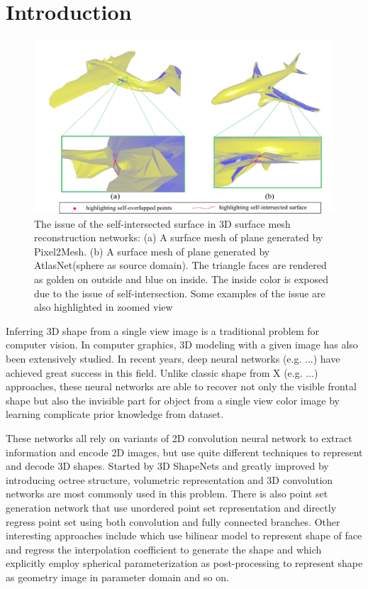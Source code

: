 \section{Introduction}
\begin{figure}[htbp]
	\centering
	\includegraphics[width=\linewidth]{img/issue/issue}
	\caption{The issue of the self-intersected surface in 3D surface mesh reconstruction networks: (a) A surface mesh of plane generated by Pixel2Mesh\cite{pixel2mesh}. (b) A surface mesh of plane generated by AtlasNet\cite{atlasnet}(sphere as source domain). The triangle faces are rendered as golden on outside and blue on inside. The inside color is exposed due to the issue of self-intersection. Some examples of the issue are also highlighted in zoomed view}
	\label{fig:issue}
\end{figure}
Inferring 3D shape from a single view image is a traditional problem for computer vision. In computer graphics, 3D modeling with a given image has also been extensively studied. In recent years, deep neural networks (e.g. \cite{3DR2N2,PSGN,3Drender,imgrecon15,3dshapenet,endface,octreegen,surfnet,shapeprior}...) have achieved great success in this field. Unlike classic shape from X (e.g. \cite{shapefromshading,shapefromtext1,shapefromtext2}...) approaches, these neural networks are able to recover not only the visible frontal shape but also the invisible part for object from a single view color image by learning complicate prior knowledge from dataset. 

These networks all rely on variants of 2D convolution neural network to extract information and encode 2D images, but use quite different techniques to represent and decode 3D shapes. Started by 3D ShapeNets\cite{3dshapenet} and greatly improved by introducing octree structure\cite{octreegen}, volumetric representation and 3D convolution networks are most commonly used in this problem. There is also point set generation network\cite{PSGN} that use unordered point set representation and directly regress point set using both convolution and fully connected branches. Other interesting approaches include \cite{endface} which use bilinear model to represent shape of face and regress the interpolation coefficient to generate the shape and \cite{surfnet} which explicitly employ spherical parameterization as post-processing to represent shape as geometry image in parameter domain and so on.

